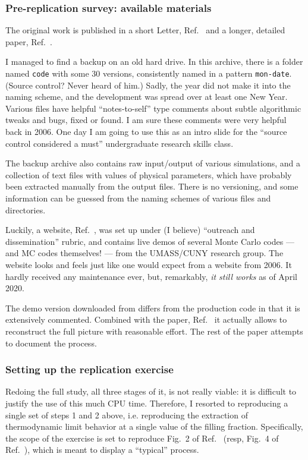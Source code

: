 \subsubsection{Pre-replication survey: available materials}
The original work is published in a short Letter, Ref.\ \cite{PRL:2006} and
a longer, detailed paper, Ref.\ \cite{NJP:2006}.

I managed to find a backup on an old hard drive. In this archive, 
there is a folder named \texttt{code} with some 30 versions,
consistently named in a pattern \texttt{mon-date}. (Source control? Never
heard of him.) Sadly, the year did not make it into the naming scheme, and the
development was spread over at least one New Year. 
Various files have helpful ``notes-to-self'' type comments
about subtle algorithmic  tweaks and bugs, fixed or found. I am sure these
comments were very helpful back in 2006. 
One day I am going to use this as an intro slide for the
``source control considered a must'' undergraduate research skills class.

The backup archive also contains raw input/output of various simulations, and
a collection of text files with values of physical parameters, which have
probably been extracted manually from the output files. There is no versioning,
and some information can be guessed from the naming schemes of various files
and directories. 

Luckily, a website, Ref.\ \cite{MCWA}, was set up under (I believe) ``outreach and
dissemination'' rubric, and contains live demos of several
Monte Carlo codes --- and MC codes themselves! --- from the UMASS/CUNY research group. 
The website looks and feels just like one would expect from a website from 2006.
It hardly received any maintenance ever, but, remarkably, 
\emph{it still works} as of April 2020. 

The demo version downloaded from \cite{MCWA} differs from the production code
in that it is extensively commented. Combined with the paper, Ref.\ \cite{NJP:2006}
it actually allows to reconstruct the full picture with reasonable effort.
The rest of the paper attempts to document the process. 


\subsubsection{Setting up the replication exercise}

Redoing the full study, all three stages of it, is not really viable:
it is difficult to justify the use of this much CPU time. Therefore, I resorted
to reproducing a single set of steps 1 and 2 above, i.e. reproducing the
extraction of thermodynamic limit behavior at a single value of the filling
fraction. Specifically, the scope of the exercise is set to reproduce Fig.\ 2
of Ref.\ \cite{PRL:2006} (resp, Fig.\ 4 of Ref.\ \cite{NJP:2006}), which is
meant to display a ``typical'' process. 

